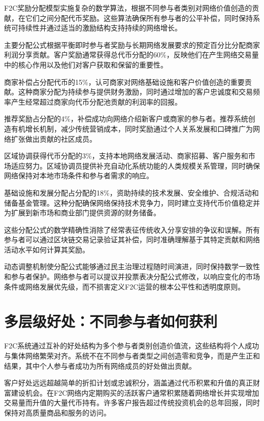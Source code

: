 \documentclass[
  Letterpaper,
]{scrbook}
\begin{document}
F2C奖励分配模型实施复杂的数学算法，根据不同参与者类别对网络价值创造的贡献，在它们之间分配代币奖励。这些算法确保所有参与者的公平补偿，同时保持系统可持续性并通过适当的激励结构支持持续的网络增长。

主要分配公式根据平衡即时参与者奖励与长期网络发展要求的预定百分比分配商家利润分享贡献。客户奖励通常获得总代币分配的60\%，反映他们在产生网络交易量中的核心作用以及他们对客户获取和保留的重要性。

商家补偿占分配代币的15\%，认可商家对网络基础设施和客户价值创造的重要贡献。这种商家分配为持续参与提供财务激励，同时通过增加的客户忠诚度和交易频率产生经常超过商家向代币分配池贡献的利润率的回报。

推荐奖励占分配的4\%，补偿成功向网络介绍新客户或商家的参与者。推荐系统创造有机增长机制，减少传统营销成本，同时奖励通过个人关系发展和口碑推广为网络扩张做出贡献的社区成员。

区域协调获得代币分配的3\%，支持本地网络发展活动、商家招募、客户服务和市场适应努力。区域协调员提供补充自动化系统功能的人类规模关系管理，同时确保网络保持对本地市场条件和参与者需求的响应。

基础设施和发展分配占分配的18\%，资助持续的技术发展、安全维护、合规活动和储备基金管理。这种分配确保网络保持技术竞争力，同时建立支持代币价值稳定并为扩展到新市场和商业部门提供资源的财务储备。

这些分配公式的数学精确性消除了经常表征传统收入分享安排的争议和误解。所有参与者可以通过区块链交易记录验证其补偿，同时准确理解基于其特定贡献和网络活动水平如何计算其奖励。

动态调整机制使分配公式能够通过民主治理过程随时间演进，同时保持数学一致性和参与者保护。网络参与者可以提议并投票表决分配公式修改，以响应变化的市场条件或网络发展优先级，而不损害定义F2C运营的根本公平性和透明度原则。

\section{多层级好处：不同参与者如何获利}\label{ux591aux5c42ux7ea7ux597dux5904ux4e0dux540cux53c2ux4e0eux8005ux5982ux4f55ux83b7ux5229}

F2C系统通过互补的好处结构为多个参与者类别创造价值流，这些结构将个人成功与集体网络繁荣对齐。系统不在不同参与者类型之间创造零和竞争，而是产生正和结果，其中个人参与者成功为所有网络成员的好处做出贡献。

客户好处远远超越简单的折扣计划或忠诚积分，涵盖通过代币积累和升值的真正财富建设机会。在F2C网络内定期购买的活跃客户通常积累随着网络增长并实现增加交易量而升值的大量代币持有。许多客户报告超过传统投资机会的总年回报，同时保持对高质量商品和服务的访问。
\end{document}
